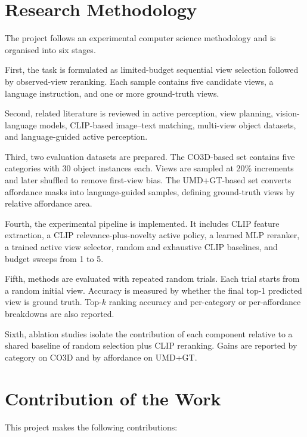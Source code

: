 \section{Research Methodology}

The project follows an experimental computer science methodology and is organised into six stages.

First, the task is formulated as limited-budget sequential view selection followed by observed-view reranking. Each sample contains five candidate views, a language instruction, and one or more ground-truth views.

Second, related literature is reviewed in active perception, view planning, vision-language models, CLIP-based image--text matching, multi-view object datasets, and language-guided active perception.

Third, two evaluation datasets are prepared. The CO3D-based set contains five categories with 30 object instances each. Views are sampled at 20\% increments and later shuffled to remove first-view bias. The UMD+GT-based set converts affordance masks into language-guided samples, defining ground-truth views by relative affordance area.

Fourth, the experimental pipeline is implemented. It includes CLIP feature extraction, a CLIP relevance-plus-novelty active policy, a learned MLP reranker, a trained active view selector, random and exhaustive CLIP baselines, and budget sweeps from 1 to 5.

Fifth, methods are evaluated with repeated random trials. Each trial starts from a random initial view. Accuracy is measured by whether the final top-1 predicted view is ground truth. Top-\(k\) ranking accuracy and per-category or per-affordance breakdowns are also reported.

Sixth, ablation studies isolate the contribution of each component relative to a shared baseline of random selection plus CLIP reranking. Gains are reported by category on CO3D and by affordance on UMD+GT.

\section{Contribution of the Work}

This project makes the following contributions:

